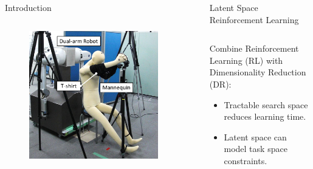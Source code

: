 \documentclass[final,hyperref={pdfpagelabels=false}]{beamer}
\begin{document}
\begin{frame}[t]
\begin{columns}[t]
\begin{column}{0.47\linewidth}
\begin{block}{Introduction}
\begin{columns}[t]
        \begin{column}{0.4\linewidth}
          \begin{figure}
            \centering
            \includegraphics[width=0.9\textwidth]{setup.png}
          \end{figure}
        \end{column}
      \end{columns}
    \end{block}
  \end{column}

  \begin{column}{0.47\linewidth}
    \begin{block}{Latent Space Reinforcement Learning}
      \begin{columns}[t]
        \begin{column}{0.65\textwidth}
          Combine Reinforcement Learning (RL) with Dimensionality Reduction (DR):
          \begin{itemize}
            \item Tractable search space reduces learning time.
            \item Latent space can model task space constraints.
          \end{itemize}
        \end{column}


\end{columns}
\end{block}
\end{column}
\end{columns}
\end{frame}
\end{document}
